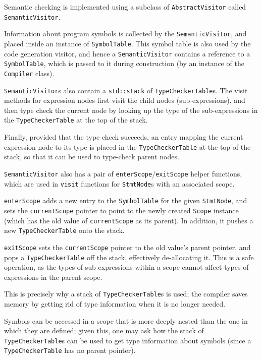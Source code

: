 \documentclass[11pt,a4paper]{scrartcl}
\begin{document}
Semantic checking is implemented using a subclass of \Verb|AbstractVisitor| called \Verb|SemanticVisitor|.

Information about program symbols is collected by the \Verb|SemanticVisitor|, and placed inside an instance of \Verb|SymbolTable|. This symbol table is also used by the code generation visitor, and hence a \Verb|SemanticVisitor| contains a reference to a \Verb|SymbolTable|, which is passed to it during construction (by an instance of the \verb|Compiler| class).

\verb|SemanticVisitor|s also contain a \verb|std::stack| of \verb|TypeCheckerTable|s. The visit methods for expression nodes first visit the child nodes (sub-expressions), and then type check the current node by looking up the type of the sub-expressions in the \verb|TypeCheckerTable| at the top of the stack.

Finally, provided that the type check succeeds, an entry mapping the current expression node to its type is placed in the \verb|TypeCheckerTable| at the top of the stack, so that it can be used to type-check parent nodes.

\verb|SemanticVisitor| also has a pair of \verb|enterScope|/\verb|exitScope| helper functions, which are used in \verb|visit| functions for \verb|StmtNode|s with an associated scope.

\verb|enterScope| adds a new entry to the \verb|SymbolTable| for the given \verb|StmtNode|, and sets the \verb|currentScope| pointer to point to the newly created \verb|Scope| instance (which has the old value of \verb|currentScope| as its parent). In addition, it pushes a new \verb|TypeCheckerTable| onto the stack.

\verb|exitScope| sets the \verb|currentScope| pointer to the old value's parent pointer, and pops a \verb|TypeCheckerTable| off the stack, effectively de-allocating it. This is a safe operation, as the types of sub-expressions within a scope cannot affect types of expressions in the parent scope.

This is precisely why a stack of \verb|TypeCheckerTable|s is used; the compiler saves memory by getting rid of type information when it is no longer needed.

Symbols can be accessed in a scope that is more deeply nested than the one in which they are defined; given this, one may ask how the stack of \verb|TypeCheckerTable|s can be used to get type information about symbols (since a \verb|TypeCheckerTable| has no parent pointer).
\end{document}
